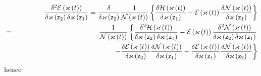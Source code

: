 \begin{eqnarray}
&&\frac{\delta ^{2}{\cal E}\left( {\cal \varkappa }\left( t\right) \right) }{%
\delta \varkappa \left( {\sf z}_{2}\right) \delta \varkappa \left( {\sf z}%
_{1}\right) }=\frac{\delta }{\delta \varkappa \left( {\sf z}_{2}\right) }%
\frac{1}{{\cal N}\left( {\cal \varkappa }\left( t\right) \right) }\left\{ 
\frac{\delta {\cal H}\left( \varkappa \left( t\right) \right) }{\delta
\varkappa \left( {\sf z}_{1}\right) }-{\cal E}\left( {\cal \varkappa }\left(
t\right) \right) \frac{\delta {\cal N}\left( \varkappa \left( t\right)
\right) }{\delta \varkappa \left( {\sf z}_{1}\right) }\right\}  \nonumber \\
&=&\frac{1}{{\cal N}\left( {\cal \varkappa }\left( t\right) \right) }\left\{ 
\frac{\delta ^{2}{\cal H}\left( {\cal \varkappa }\left( t\right) \right) }{%
\delta \varkappa \left( {\sf z}_{2}\right) \delta \varkappa \left( {\sf z}%
_{1}\right) }-{\cal E}\left( {\cal \varkappa }\left( t\right) \right) \frac{%
\delta ^{2}{\cal N}\left( {\cal \varkappa }\left( t\right) \right) }{\delta
\varkappa \left( {\sf z}_{2}\right) \delta \varkappa \left( {\sf z}%
_{1}\right) }\right. \\
&&\qquad \qquad \qquad \qquad \qquad \qquad \qquad \left. -\frac{\delta 
{\cal E}\left( \varkappa \left( t\right) \right) }{\delta \varkappa \left( 
{\sf z}_{2}\right) }\frac{\delta {\cal N}\left( \varkappa \left( t\right)
\right) }{\delta \varkappa \left( {\sf z}_{1}\right) }-\frac{\delta {\cal E}%
\left( \varkappa \left( t\right) \right) }{\delta \varkappa \left( {\sf z}%
_{1}\right) }\frac{\delta {\cal N}\left( \varkappa \left( t\right) \right) }{%
\delta \varkappa \left( {\sf z}_{2}\right) }\right\}
\end{eqnarray}%
hence 
